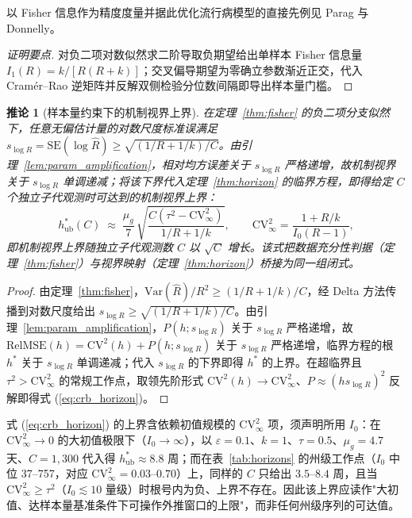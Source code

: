 \documentclass[10pt,a4paper]{article}
\theoremstyle{plain}
\newtheorem{corollary}{推论}
\theoremstyle{definition}
\begin{document}
以 Fisher 信息作为精度度量并据此优化流行病模型的直接先例见 Parag 与 Donnelly\citep{parag2020adaptive}。

\begin{proof}[证明要点]
对负二项对数似然求二阶导取负期望给出单样本 Fisher 信息量 $I_1(R) = k/[R(R+k)]$；交叉偏导期望为零确立参数渐近正交，代入 Cramér--Rao 逆矩阵并反解双侧检验分位数间隔即导出样本量门槛。
\end{proof}

\begin{corollary}[样本量约束下的机制视界上界]\label{cor:crb_horizon}
在定理~\ref{thm:fisher} 的负二项分支似然下，任意无偏估计量的对数尺度标准误满足 $s_{\log R} = \text{SE}(\log\hat{R}) \ge \sqrt{(1/R + 1/k)/C}$。由引理~\ref{lem:param_amplification}，相对均方误差关于 $s_{\log R}$ 严格递增，故机制视界关于 $s_{\log R}$ 单调递减；将该下界代入定理~\ref{thm:horizon} 的临界方程，即得给定 $C$ 个独立子代观测时可达到的机制视界上界：
\begin{equation}
h^*_{\text{ub}}(C) \;\approx\; \frac{\mu_g}{7}\,\sqrt{\frac{C\left(\tau^2 - \text{CV}^2_\infty\right)}{1/R+1/k}},
\qquad \text{CV}^2_\infty = \frac{1+R/k}{I_0(R-1)},
\label{eq:crb_horizon}
\end{equation}
即机制视界上界随独立子代观测数 $C$ 以 $\sqrt{C}$ 增长。该式把数据充分性判据（定理~\ref{thm:fisher}）与视界映射（定理~\ref{thm:horizon}）桥接为同一组闭式。
\end{corollary}

\begin{proof}
由定理~\ref{thm:fisher}，$\text{Var}(\hat{R})/R^2 \ge (1/R+1/k)/C$，经 Delta 方法传播到对数尺度给出 $s_{\log R} \ge \sqrt{(1/R+1/k)/C}$。由引理~\ref{lem:param_amplification}，$P(h;s_{\log R})$ 关于 $s_{\log R}$ 严格递增，故 $\text{RelMSE}(h) = \text{CV}^2(h) + P(h;s_{\log R})$ 关于 $s_{\log R}$ 严格递增，临界方程的根 $h^*$ 关于 $s_{\log R}$ 单调递减；代入 $s_{\log R}$ 的下界即得 $h^*$ 的上界。在超临界且 $\tau^2 > \text{CV}^2_\infty$ 的常规工作点，取领先阶形式 $\text{CV}^2(h) \to \text{CV}^2_\infty$、$P \approx (h s_{\log R})^2$ 反解即得式 (\ref{eq:crb_horizon})。
\end{proof}

式 (\ref{eq:crb_horizon}) 的上界含依赖初值规模的 $\text{CV}^2_\infty$ 项，须声明所用 $I_0$：在 $\text{CV}^2_\infty \to 0$ 的大初值极限下（$I_0 \to \infty$），以 $\varepsilon=0.1$、$k=1$、$\tau=0.5$、$\mu_g=4.7$ 天、$C=1{,}300$ 代入得 $h^*_{\text{ub}} \approx 8.8$ 周；而在表~\ref{tab:horizons} 的州级工作点（$I_0$ 中位 37--757，对应 $\text{CV}^2_\infty = 0.03$--$0.70$）上，同样的 $C$ 只给出 $3.5$--$8.4$ 周，且当 $\text{CV}^2_\infty \ge \tau^2$（$I_0 \lesssim 10$ 量级）时根号内为负、上界不存在。因此该上界应读作"大初值、达样本量基准条件下可操作外推窗口的上限"，而非任何州级序列的可达值。
\end{document}

